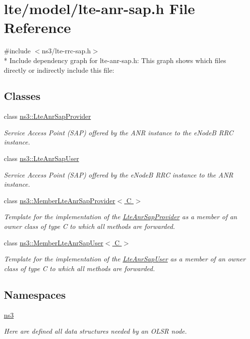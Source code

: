 \hypertarget{lte-anr-sap_8h}{}\section{lte/model/lte-\/anr-\/sap.h File Reference}
\label{lte-anr-sap_8h}
{\ttfamily \#include $<$ns3/lte-\/rrc-\/sap.\+h$>$}\\*
Include dependency graph for lte-\/anr-\/sap.h\+:
This graph shows which files directly or indirectly include this file\+:
\subsection*{Classes}
\begin{DoxyCompactItemize}
\item 
class \hyperlink{classns3_1_1LteAnrSapProvider}{ns3\+::\+Lte\+Anr\+Sap\+Provider}
\begin{DoxyCompactList}\small\item\em Service Access Point (S\+AP) offered by the A\+NR instance to the e\+NodeB R\+RC instance. \end{DoxyCompactList}\item 
class \hyperlink{classns3_1_1LteAnrSapUser}{ns3\+::\+Lte\+Anr\+Sap\+User}
\begin{DoxyCompactList}\small\item\em Service Access Point (S\+AP) offered by the e\+NodeB R\+RC instance to the A\+NR instance. \end{DoxyCompactList}\item 
class \hyperlink{classns3_1_1MemberLteAnrSapProvider}{ns3\+::\+Member\+Lte\+Anr\+Sap\+Provider$<$ C $>$}
\begin{DoxyCompactList}\small\item\em Template for the implementation of the \hyperlink{classns3_1_1LteAnrSapProvider}{Lte\+Anr\+Sap\+Provider} as a member of an owner class of type C to which all methods are forwarded. \end{DoxyCompactList}\item 
class \hyperlink{classns3_1_1MemberLteAnrSapUser}{ns3\+::\+Member\+Lte\+Anr\+Sap\+User$<$ C $>$}
\begin{DoxyCompactList}\small\item\em Template for the implementation of the \hyperlink{classns3_1_1LteAnrSapUser}{Lte\+Anr\+Sap\+User} as a member of an owner class of type C to which all methods are forwarded. \end{DoxyCompactList}\end{DoxyCompactItemize}
\subsection*{Namespaces}
\begin{DoxyCompactItemize}
\item 
 \hyperlink{namespacens3}{ns3}
\begin{DoxyCompactList}\small\item\em Here are defined all data structures needed by an O\+L\+SR node. \end{DoxyCompactList}\end{DoxyCompactItemize}

